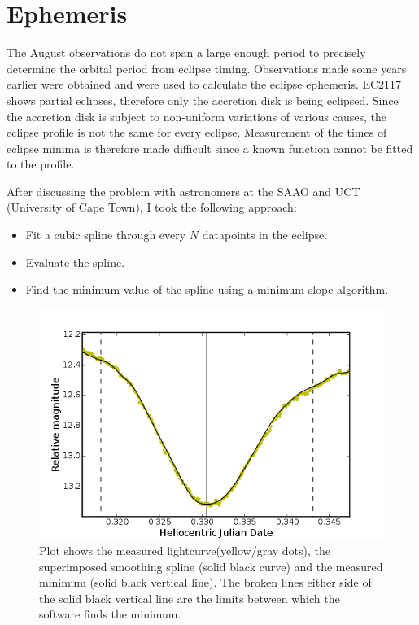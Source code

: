 \section{Ephemeris}

\label{ephemeris_section}

The August observations do not span a large enough period to precisely determine the orbital period from eclipse timing. Observations made some years earlier \citep{WWP} were obtained and were used to calculate the eclipse ephemeris. EC2117 shows partial eclipses, therefore only the accretion disk is being eclipsed. Since the accretion disk is subject to non-uniform variations of various causes, the eclipse profile is not the same for every eclipse. Measurement of the times of eclipse minima is therefore made difficult since a known function cannot be fitted to the profile.

After discussing the problem with astronomers at the SAAO and UCT (University of Cape Town), I took the following approach:

\begin{itemize}
 \item Fit a cubic spline through every $N$ datapoints in the eclipse.
 \item Evaluate the spline.
 \item Find the minimum value of the spline using a minimum slope algorithm.
\end{itemize}


\begin{figure}
\begin{center}
\includegraphics[width=0.85\columnwidth,bb=0 0 600 400]{images/eclipseminimum.png}
\caption[Measurement of eclipse minimum]{Plot shows the measured lightcurve(yellow/gray dots), the superimposed smoothing spline (solid black curve) and the measured minimum (solid black vertical line). The broken lines either side of the solid black vertical line are the limits between which the software finds the minimum.}
\label{eclipseminimum}
\end{center}
\end{figure}


